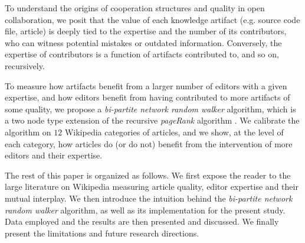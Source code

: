 To understand the origins of cooperation structures and quality in open collaboration, we posit that the value of each knowledge artifact (e.g. source code file, article) is deeply tied to the expertise and the number of its contributors, who can witness potential mistakes or outdated information. Conversely, the expertise of contributors is a function of artifacts contributed to, and so on, recursively.

To measure how artifacts benefit from a larger number of editors with a given expertise, and how editors benefit from having contributed to more artifacts of some quality, we propose a {\it bi-partite network random walker} algorithm, which is a two node type extension of the recursive {\it pageRank} algorithm \cite{page1999pagerank,kleinberg1999}. We calibrate the algorithm on $12$ Wikipedia categories of articles, and we show, at the level of each category, how articles do (or do not) benefit from the intervention of more editors and their expertise.

The rest of this paper is organized as follows. We first expose the reader to the large literature on Wikipedia measuring article quality, editor expertise and their mutual interplay. We then introduce the intuition behind the {\it bi-partite network random walker} algorithm, as well as its implementation for the present study. Data employed and the results are then presented and discussed. We finally present the limitations and future research directions.
